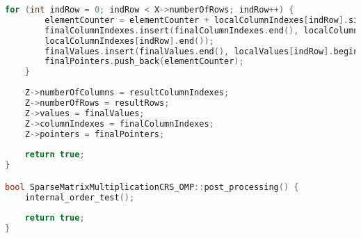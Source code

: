 \documentclass[a4paper, 14pt]{article}
\theoremstyle{plain}
\begin{document}
\begin{lstlisting}[language=C++,caption=Файл sparse\_matmult\_crs\_omp.cpp]
	for (int indRow = 0; indRow < X->numberOfRows; indRow++) {
		elementCounter = elementCounter + localColumnIndexes[indRow].size();
		finalColumnIndexes.insert(finalColumnIndexes.end(), localColumnIndexes[indRow].begin(),
		localColumnIndexes[indRow].end());
		finalValues.insert(finalValues.end(), localValues[indRow].begin(), localValues[indRow].end());
		finalPointers.push_back(elementCounter);
	}
	
	Z->numberOfColumns = resultColumnIndexes;
	Z->numberOfRows = resultRows;
	Z->values = finalValues;
	Z->columnIndexes = finalColumnIndexes;
	Z->pointers = finalPointers;
	
	return true;
}

bool SparseMatrixMultiplicationCRS_OMP::post_processing() {
	internal_order_test();
	
	return true;
}
\end{lstlisting}
\end{document}
